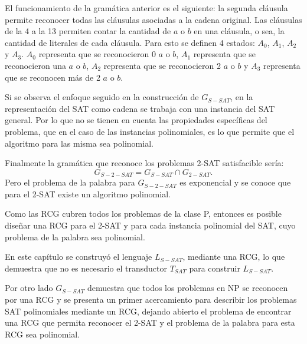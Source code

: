 El funcionamiento de la gramática anterior es el siguiente: la segunda cláusula permite reconocer todas las
cláusulas asociadas a la cadena original. Las cláusulas de la 4 a la 13 permiten contar la cantidad de $a$ o $b$ en
una cláusula, o sea, la cantidad de literales de cada cláusula. Para esto se definen 4 estados: $A_0$, $A_1$, $A_2$ y $A_3$.
$A_0$ representa que se reconocieron 0 $a$ o $b$, $A_1$ representa que se reconocieron una $a$ o $b$, $A_2$
representa que se reconocieron 2 $a$ o $b$ y  $A_3$ representa que se reconocen más de 2 $a$ o $b$.

Si se observa el enfoque seguido en la construcción de $G_{S-SAT}$, en la representación del SAT como cadena se
trabaja con una instancia del SAT general. Por lo que no se tienen en cuenta las propiedades específicas
del problema, que en el caso de las instancias polinomiales, es lo que permite que el algoritmo para
las misma sea polinomial.

Finalmente la gramática que reconoce los problemas 2-SAT satisfacible sería:
$$G_{S-2-SAT}=G_{S-SAT}\cap G_{2-SAT}.$$
Pero el problema de la palabra para $G_{S-2-SAT}$ es exponencial y se conoce que para el 2-SAT existe un algoritmo
polinomial.

Como las RCG cubren todos los problemas de la clase P, entonces es posible
diseñar una RCG para el 2-SAT y para cada instancia polinomial del SAT, cuyo problema de la palabra sea polinomial.

En este capítulo se construyó el lenguaje $L_{S-SAT}$, mediante una RCG, lo que demuestra que no es necesario el transductor $T_{SAT}$ para construir $L_{S-SAT}$.

Por otro lado $G_{S-SAT}$ demuestra que todos los problemas en NP se reconocen por una RCG y se presenta un primer
acercamiento para describir los problemas SAT polinomiales mediante un RCG, dejando abierto el problema de
encontrar una RCG que permita reconocer el 2-SAT y el problema de la palabra para esta RCG sea polinomial.